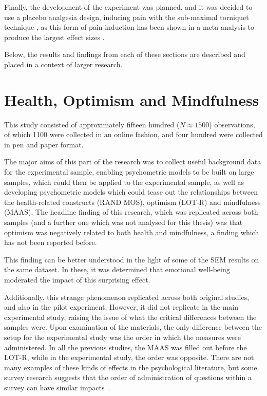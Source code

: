 Finally, the development of the experiment was planned, and it was
decided to use a placebo analgesia design, inducing pain with the
sub-maximal torniquet technique \cite{moore1979submaximal}, as this
form of pain induction has been shown in a meta-analysis to produce
the largest effect sizes \cite{Sauro2005}.

Below, the results and findings from each of these sections are
described and placed in a context of larger research.

\section{Health, Optimism and Mindfulness}
\label{sec:health-optim-mindf}

This study consisted of approximately fifteen hundred ($N \approx
1500$) observations, of which 1100 were collected in an online
fashion, and four hundred were collected in pen and paper format.

The major aims of this part of the research was to collect useful
background data for the experimental sample, enabling psychometric
models to be built on large samples, which could then be applied to
the experimental sample, as well as developing psychometric models which
could tease out the relationships between the health-related
constructs (RAND MOS), optimism (LOT-R) and mindfulness (MAAS). The
headline finding of this research, which was replicated across both
samples (and a further one which was not analysed for this thesis) was
that optimism was negatively related to both health and mindfulness, a
finding which has not been reported before.

This finding can be better understood in the light of some of the SEM
results on the same dataset. In these, it was determined that
emotional well-being moderated the impact of this surprising effect.


Additionally, this strange phenomenon replicated across both original
studies, and also in the pilot experiment. However, it did not
replicate in the main experimental study, raising the issue of what
the critical differences between the samples were. Upon examination of
the materials, the only difference between the setup for the
experimental study was the order in which the measures were
administered. In all the previous studies, the MAAS was filled out
before the LOT-R, while in the experimental study, the order was
opposite. There are not many examples of these kinds of effects in the psychological literature, but some survey research suggests that the order of administration of questions within a survey can have similar impacts~\cite{schwarz1999self}. 

